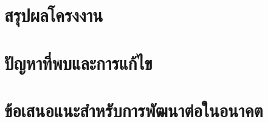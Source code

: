 \section{สรุปผลโครงงาน}

\section{ปัญหาที่พบและการแก้ไข}

\section{ข้อเสนอแนะสำหรับการพัฒนาต่อในอนาคต}
